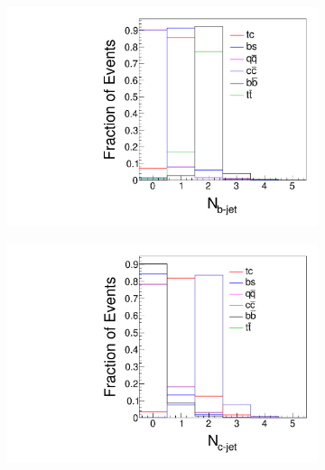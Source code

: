 \documentclass[a4paper,11pt]{article}
\begin{document}
\begin{figure}[htbp]
  \centering
  \captionsetup[sub]{font=large}
  \begin{subfigure}[t]{0.45\textwidth}
     \includegraphics[width=\linewidth]{nbjets.pdf}
     \caption{}
     \label{fig:nbjets}
  \end{subfigure}
  \begin{subfigure}[t]{0.45\textwidth}
     \includegraphics[width=\linewidth]{ncjets.pdf}
     \caption{}
     \label{fig:ncjets}
  \end{subfigure}
  \begin{subfigure}[t]{0.45\textwidth}

\end{subfigure}
\end{figure}
\end{document}
